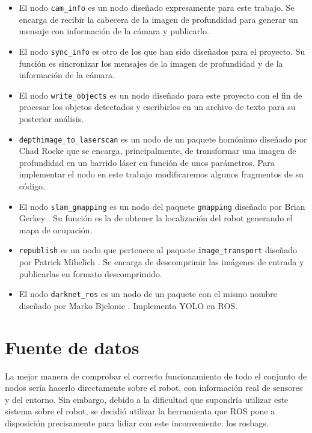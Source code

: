 \begin{itemize}

	\item El nodo \texttt{cam\_info} es un nodo diseñado expresamente para este trabajo. Se encarga de recibir la cabecera de la imagen de profundidad para generar un mensaje con información de la cámara y publicarlo.
	\item El nodo \texttt{sync\_info} es otro de los que han sido diseñados para el proyecto. Su función es sincronizar los mensajes de la imagen de profundidad y de la información de la cámara.
	\item El nodo \texttt{write\_objects} es un nodo diseñado para este proyecto con el fin de procesar los objetos detectados y escribirlos en un archivo de texto para su posterior análisis.
	\item \texttt{depthimage\_to\_laserscan} es un nodo de un paquete homónimo diseñado por Chad Rocke \cite{di2ls} que se encarga, principalmente, de transformar una imagen de profundidad en un barrido láser en función de unos parámetros. Para implementar el nodo en este trabajo modificaremos algunos fragmentos de su código.
	\item El nodo \texttt{slam\_gmapping} es un nodo del paquete \texttt{gmapping} diseñado por Brian Gerkey \cite{gmapping}. Su función es la de obtener la localización del robot generando el mapa de ocupación.
	\item \texttt{republish} es un nodo que pertenece al paquete \texttt{image\_transport} diseñado por Patrick Mihelich \cite{republish}. Se encarga de descomprimir las imágenes de entrada y publicarlas en formato descomprimido.
	\item El nodo \texttt{darknet\_ros} es un nodo de un paquete con el mismo nombre diseñado por Marko Bjelonic \cite{darknet}. Implementa YOLO en ROS.
	
	

\end{itemize}


\section{Fuente de datos} \label{sec:datos}

La mejor manera de comprobar el correcto funcionamiento de todo el conjunto de nodos sería hacerlo directamente sobre el robot, con información real de sensores y del entorno. Sin embargo, debido a la dificultad que supondría utilizar este sistema sobre el robot, se decidió utilizar la herramienta que ROS pone a disposición precisamente para lidiar con este inconveniente: los rosbags.\\

